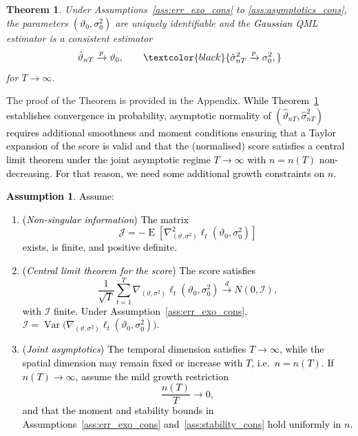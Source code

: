 \documentclass[12pt]{article}
\theoremstyle{plain}
\newtheorem{theorem}{Theorem}[section]
\theoremstyle{definition}
\DeclareMathOperator{\E}{E}
\DeclareMathOperator{\Var}{Var}
\newtheorem{assumption}{Assumption}
\begin{document}
\begin{theorem}\label{th:consistency}
Under Assumptions~\ref{ass:err_exo_cons} to \ref{ass:asymptotics_cons}, the parameters \textcolor{black}{$(\vartheta_0,\sigma_0^2)$} are uniquely identifiable and the \textcolor{black}{Gaussian} QML estimator is a consistent estimator
\[
\hat\vartheta_{nT}\xrightarrow{p}\vartheta_0,\qquad
\textcolor{black}{\hat\sigma^2_{nT}\xrightarrow{p}\sigma_0^2,}
\]
for $T \to \infty$.
\end{theorem}


The proof of the Theorem is provided in the Appendix. \textcolor{black}{While Theorem~\ref{th:consistency} establishes convergence in probability, asymptotic normality of $(\hat\vartheta_{nT},\hat\sigma^2_{nT})$ requires additional smoothness and moment conditions ensuring that a Taylor expansion of the score is valid and that the (normalised) score satisfies a central limit theorem under the joint asymptotic regime $T\to\infty$ with $n=n(T)$ non-decreasing. For that reason, we need some additional growth constraints on $n$.}

\textcolor{black}{
\begin{assumption}\label{ass:AN_reg}
Assume:
%
\begin{enumerate}
\item[(i)] (\emph{Non-singular information})
The matrix
\[
\mathcal{J}
=
-\E\!\left[\nabla^2_{(\vartheta,\sigma^2)}\ell_t(\vartheta_0,\sigma_0^2)\right]
\]
exists, is finite, and positive definite.
%
\item[(ii)] (\emph{Central limit theorem for the score})
The score satisfies
\[
\frac{1}{\sqrt{T}}\sum_{t=1}^T
\nabla_{(\vartheta,\sigma^2)}\ell_t(\vartheta_0,\sigma_0^2)
\xrightarrow{d} N(0,\mathcal{I}),
\]
with $\mathcal{I}$ finite.
Under Assumption~\ref{ass:err_exo_cons},
$\mathcal{I}=\Var\!\big(\nabla_{(\vartheta,\sigma^2)}\ell_t(\vartheta_0,\sigma_0^2)\big)$.
%
\item[(iii)] (\emph{Joint asymptotics})
The temporal dimension satisfies $T\to\infty$, while the spatial
dimension may remain fixed or increase with $T$, i.e.\ $n=n(T)$.
If $n(T)\to\infty$, assume the mild growth restriction
\[
\frac{n(T)}{T}\to0,
\]
and that the moment and stability bounds in
Assumptions~\ref{ass:err_exo_cons} and~\ref{ass:stability_cons}
hold uniformly in $n$.
\end{enumerate}
\end{assumption}
}
\end{document}
